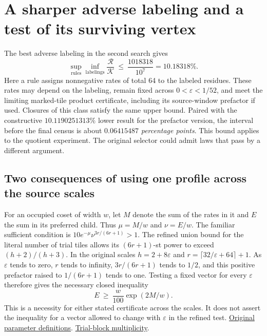 \section{A sharper adverse labeling and a test of its surviving vertex}
\label{sec:rootmark}

The best adverse labeling in the second search gives
\[
 \sup_{\text{rules}}\inf_{\text{labelings}}
 \frac{\mathcal R}{\mathcal K}
 \ \le\ \frac{1018318}{10^7}=10.18318\%.
\]
Here a rule assigns nonnegative rates of total 64 to the labeled residues. These rates may depend on the labeling, remain fixed across \(0<\varepsilon<1/52\), and meet the limiting marked-tile product certificate, including its source-window prefactor if used. Closures of this class satisfy the same upper bound. Paired with the constructive \(10.1190251313\%\) lower result for the prefactor version, the interval before the final census is about \(0.06415487\) \emph{percentage points}. This bound applies to the quotient experiment. The original selector could admit laws that pass by a different argument.

\subsection{Two consequences of using one profile across the source scales}

For an occupied coset of width \(w\), let \(M\) denote the sum of the rates in it and \(E\) the sum in its preferred child. Thus \(\mu=M/w\) and \(\nu=E/w\). The familiar sufficient condition is
\(10e^{-\mu}\nu^{3r/(6r+1)}>1\).
The refined union bound for the literal number of trial tiles allows its \((6r+1)\)-st power to exceed \((h+2)/(h+3)\). In the original scales \(h=2+8\varepsilon\) and \(r=\lceil32/\varepsilon+64\rceil+1\). As \(\varepsilon\) tends to zero, \(r\) tends to infinity, \(3r/(6r+1)\) tends to \(1/2\), and this positive prefactor raised to \(1/(6r+1)\) tends to one. Testing a fixed vector for every \(\varepsilon\) therefore gives the necessary closed inequality
\[
 E\ \ge\ \frac{w}{100}\exp(2M/w).
 \tag{R1}
\]
This is a necessity for either stated certificate across the scales. It does not assert the inequality for a vector allowed to change with \(\varepsilon\) in the refined test.
\href{https://github.com/nousentllc/riemann-hypothesis/blob/40e56bab026552e089d7afcfeff08d2defb9c005/src/Development/AutomorphicArithmetic/ThickFrames/MarkedLow.lean#L20-L31}{Original parameter definitions}.
\href{https://github.com/nousentllc/riemann-hypothesis/blob/40e56bab026552e089d7afcfeff08d2defb9c005/src/Formalism/SharpRestriction/GrowthBounds/UnramifiedQuadraticSetting.lean#L237-L251}{Trial-block multiplicity}.

